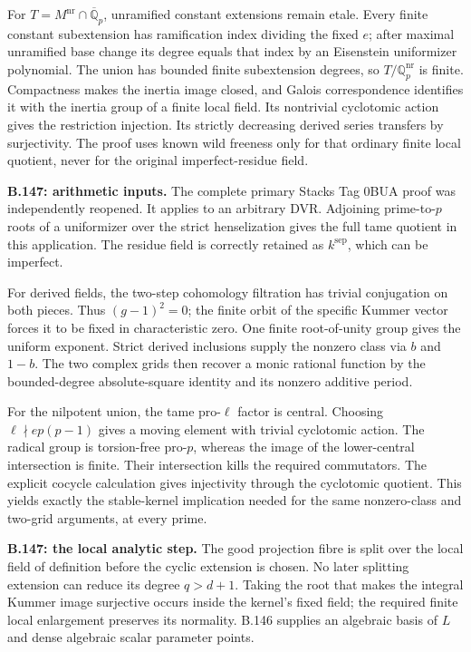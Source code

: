 For $T=M^{\mathrm{nr}}\cap\overline{\mathbb Q}_p$,
unramified constant extensions remain etale.
Every finite constant subextension has ramification
index dividing the fixed $e$; after maximal
unramified base change its degree equals that
index by an Eisenstein uniformizer polynomial.
The union has bounded finite subextension degrees,
so $T/\mathbb Q_p^{\mathrm{nr}}$ is finite.
Compactness makes the inertia image closed,
and Galois correspondence identifies it with
the inertia group of a finite local field.
Its nontrivial cyclotomic action gives the
restriction injection.  Its strictly decreasing
derived series transfers by surjectivity.
The proof uses known wild freeness only for
that ordinary finite local quotient, never
for the original imperfect-residue field.

\medskip\noindent\textbf{B.147: arithmetic inputs.}
The complete primary Stacks Tag 0BUA proof
was independently reopened.  It applies to an
arbitrary DVR.  Adjoining prime-to-$p$ roots
of a uniformizer over the strict henselization
gives the full tame quotient in this application.
The residue field is correctly retained as
$k^{\mathrm{sep}}$, which can be imperfect.

For derived fields, the two-step cohomology
filtration has trivial conjugation on both
pieces.  Thus $(g-1)^2=0$; the finite orbit
of the specific Kummer vector forces it to
be fixed in characteristic zero.  One finite
root-of-unity group gives the uniform exponent.
Strict derived inclusions supply the nonzero
class via $b$ and $1-b$.  The two complex
grids then recover a monic rational function
by the bounded-degree absolute-square identity
and its nonzero additive period.

For the nilpotent union, the tame pro-$\ell$
factor is central.  Choosing
$\ell\nmid ep(p-1)$ gives a moving element
with trivial cyclotomic action.  The radical
group is torsion-free pro-$p$, whereas the
image of the lower-central intersection is
finite.  Their intersection kills the required
commutators.  The explicit cocycle calculation
gives injectivity through the cyclotomic quotient.
This yields exactly the stable-kernel implication
needed for the same nonzero-class and two-grid
arguments, at every prime.

\medskip\noindent\textbf{B.147: the local analytic step.}
The good projection fibre is split over the
local field of definition before the cyclic
extension is chosen.  No later splitting
extension can reduce its degree $q>d+1$.
Taking the root that makes the integral
Kummer image surjective occurs inside the
kernel's fixed field; the required finite
local enlargement preserves its normality.
B.146 supplies an algebraic basis of $L$
and dense algebraic scalar parameter points.

